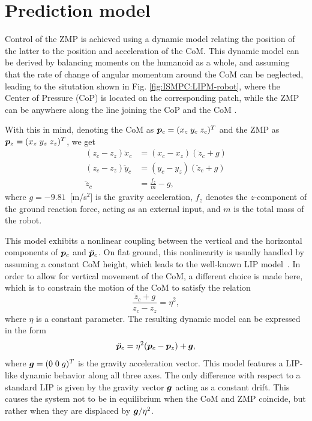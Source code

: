 \section{Prediction model}

Control of the ZMP is achieved using a dynamic model relating the position of the latter to the position and acceleration of the CoM. This dynamic model can be derived by balancing moments on the humanoid as a whole, and assuming that the rate of change of angular momentum around the CoM can be neglected, leading to the situtation shown in Fig. \ref{fig:ISMPC:LIPM-robot}, where the Center of Pressure (CoP) is located on the corresponding patch, while the ZMP can be anywhere along the line joining the CoP and the CoM \cite{Caron2017DynamicWalkingOverRoughTerrains}.

With this in mind, denoting the CoM as ${\bm{p}}_c = (x_c \; y_c \; z_c)^T$ and the ZMP as ${\bm{p}}_z = (x_z \; y_z \; z_z)^T$, we get
\begin{equation}\begin{split}
(z_c - z_z)\ddot x_c &= (x_c - x_z)(\ddot z_c + g) \\
(z_c - z_z)\ddot y_c &= (y_c - y_z)(\ddot z_c + g) \\
\ddot{z}_c &= \frac{f_z}{m}-g,
\end{split}\end{equation}
where $g=-9.81$~[m/s$^2$] is the gravity acceleration, $f_z$ denotes the $z$-component of the ground reaction force, acting as an external input, and $m$ is the total mass of the robot.

This model exhibits a nonlinear coupling between the vertical and the horizontal components of ${\bm{p}}_c$ and $\ddot{{\bm{p}}}_c$. On flat ground, this nonlinearity is usually handled by assuming a constant CoM height, which leads to the well-known LIP model~\cite{Kajita2003BipedWalkingPatternGeneration}. In order to allow for vertical movement of the CoM, a different choice is made here, which is to constrain the motion of the CoM \cite{Zamparelli2018SYROCO} to satisfy the relation
\begin{equation*}
    \frac{\ddot z_c + g}{z_c - z_z} = \eta^2,
\end{equation*}
where $\eta$ is a constant parameter.
The resulting dynamic model can be expressed in the form
\begin{equation}\label{eq:WoS:3dmodel}
\ddot {{\bm{p}}}_c = \eta^2({\bm{p}}_c - {\bm{p}}_z) + {\bm{g}},
\end{equation}
where ${\bm{g}} = (0 \; 0 \; {g})^T$ is the gravity acceleration vector. This model features a LIP-like dynamic behavior along all three axes. The only difference with respect to a standard LIP is given by the gravity vector ${\bm{g}}$ acting as a constant drift. This causes the system not to be in equilibrium when the CoM and ZMP coincide, but rather when they are displaced by ${\bm{g}}/\eta^2$.

